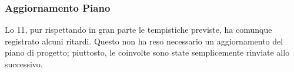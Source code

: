 \subsubsection{Aggiornamento Piano}
\label{sec:aggiornamento_piano_sprint11}
Lo  11, pur rispettando in gran parte le tempistiche previste, ha comunque registrato alcuni ritardi. 
Questo non ha reso necessario un aggiornamento del piano di progetto; 
piuttosto, le  coinvolte sono state semplicemente rinviate allo  successivo.

